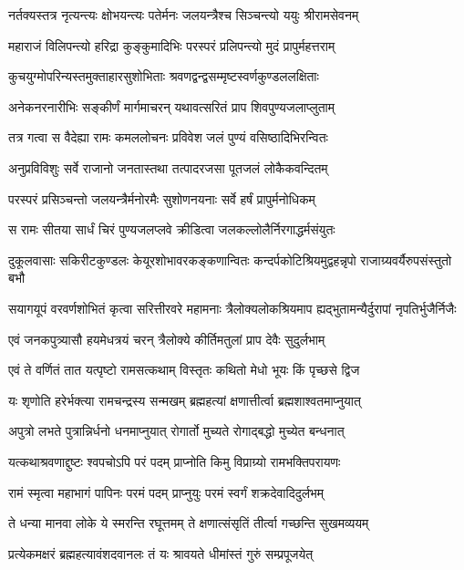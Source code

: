 \twolineshloka
{नर्तक्यस्तत्र नृत्यन्त्यः क्षोभयन्त्यः पतेर्मनः}
{जलयन्त्रैश्च सिञ्चन्त्यो ययुः श्रीरामसेवनम्}%

\twolineshloka
{महाराजं विलिपन्त्यो हरिद्रा कुङ्कुमादिभिः}
{परस्परं प्रलिपन्त्यो मुदं प्रापुर्महत्तराम्}%

\twolineshloka
{कुचयुग्मोपरिन्यस्तमुक्ताहारसुशोभिताः}
{श्रवणद्वन्द्वसम्मृष्टस्वर्णकुण्डललक्षिताः}%

\twolineshloka
{अनेकनरनारीभिः सङ्कीर्णं मार्गमाचरन्}
{यथावत्सरितं प्राप शिवपुण्यजलाप्लुताम्}%

\twolineshloka
{तत्र गत्वा स वैदेह्या रामः कमललोचनः}
{प्रविवेश जलं पुण्यं वसिष्ठादिभिरन्वितः}%

\twolineshloka
{अनुप्रविविशुः सर्वे राजानो जनतास्तथा}
{तत्पादरजसा पूतजलं लोकैकवन्दितम्}%

\twolineshloka
{परस्परं प्रसिञ्चन्तो जलयन्त्रैर्मनोरमैः}
{सुशोणनयनाः सर्वे हर्षं प्रापुर्मनोधिकम्}%

\twolineshloka
{स रामः सीतया सार्धं चिरं पुण्यजलप्लवे}
{क्रीडित्वा जलकल्लोलैर्निरगाद्धर्मसंयुतः}%

\twolineshloka
{दुकूलवासाः सकिरीटकुण्डलः केयूरशोभावरकङ्कणान्वितः}
{कन्दर्पकोटिश्रियमुद्वहन्नृपो राजाग्र्यवर्यैरुपसंस्तुतो बभौ}%

\twolineshloka
{सयागयूपं वरवर्णशोभितं कृत्वा सरित्तीरवरे महामनाः}
{त्रैलोक्यलोकश्रियमाप ह्यद्भुतामन्यैर्दुरापां नृपतिर्भुजैर्निजैः}%

\twolineshloka
{एवं जनकपुत्र्यासौ हयमेधत्रयं चरन्}
{त्रैलोक्ये कीर्तिमतुलां प्राप देवैः सुदुर्लभाम्}%

\twolineshloka
{एवं ते वर्णितं तात यत्पृष्टो रामसत्कथाम्}
{विस्तृतः कथितो मेधो भूयः किं पृच्छसे द्विज}%

\twolineshloka
{यः शृणोति हरेर्भक्त्या रामचन्द्रस्य सन्मखम्}
{ब्रह्महत्यां क्षणात्तीर्त्वा ब्रह्मशाश्वतमाप्नुयात्}%

\twolineshloka
{अपुत्रो लभते पुत्रान्निर्धनो धनमाप्नुयात्}
{रोगार्तो मुच्यते रोगाद्बद्धो मुच्येत बन्धनात्}%

\twolineshloka
{यत्कथाश्रवणाद्दुष्टः श्वपचोऽपि परं पदम्}
{प्राप्नोति किमु विप्राग्र्यो रामभक्तिपरायणः}%

\twolineshloka
{रामं स्मृत्वा महाभागं पापिनः परमं पदम्}
{प्राप्नुयुः परमं स्वर्गं शक्रदेवादिदुर्लभम्}%

\twolineshloka
{ते धन्या मानवा लोके ये स्मरन्ति रघूत्तमम्}
{ते क्षणात्संसृतिं तीर्त्वा गच्छन्ति सुखमव्ययम्}%

\twolineshloka
{प्रत्येकमक्षरं ब्रह्महत्यावंशदवानलः}
{तं यः श्रावयते धीमांस्तं गुरुं सम्प्रपूजयेत्}%

